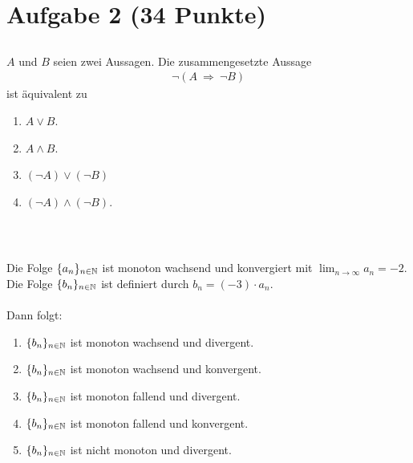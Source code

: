 \section*{Aufgabe 2 (34 Punkte)}
\vspace{0.4cm}

\subsection*{}
$ A $ und $ B $ seien zwei Aussagen. Die zusammengesetzte Aussage
\begin{align*}
	\neg (A \ \Rightarrow \ \neg B)
\end{align*}
ist äquivalent zu 
 \renewcommand{\labelenumi}{(\alph{enumi})}
\begin{enumerate}
\item $ A \vee B $.
\item $ A \wedge B $.
\item $ (\neg A) \vee (\neg B)$
\item $ (\neg A) \wedge (\neg B)$.
\end{enumerate}
\ \\
\subsection*{}
Die Folge $ \lbrace a_n \rbrace_{n \in \mathbb{N}} $ ist monoton wachsend und konvergiert mit $ \lim_{n \to \infty} a_n = -2 $.
Die Folge $ \lbrace b_n \rbrace_{n \in \mathbb{N}} $ ist definiert durch $ b_n = (-3) \cdot a_n $.\\
\\
Dann folgt:
\renewcommand{\labelenumi}{(\alph{enumi})}
\begin{enumerate}
\item $ \lbrace b_n \rbrace_{n \in \mathbb{N}} $ ist monoton wachsend und divergent.
\item $ \lbrace b_n \rbrace_{n \in \mathbb{N}} $ ist monoton wachsend und konvergent.
\item $ \lbrace b_n \rbrace_{n \in \mathbb{N}} $ ist monoton fallend und divergent.
\item $ \lbrace b_n \rbrace_{n \in \mathbb{N}} $ ist monoton fallend und konvergent.
\item $ \lbrace b_n \rbrace_{n \in \mathbb{N}} $ ist nicht monoton und divergent.
\end{enumerate}
\ \\
